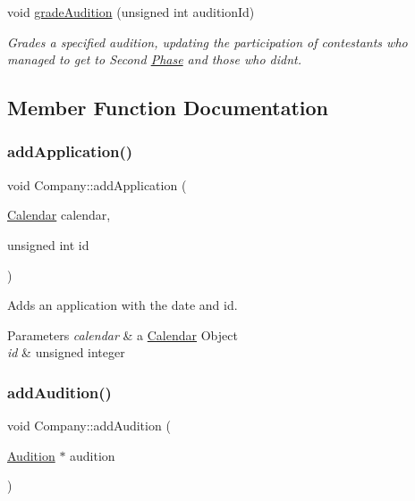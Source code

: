 \begin{DoxyCompactItemize}
$$void \hyperlink{class_company_a56268c11009ad2441a1dde545f7ceacf}{grade\+Audition} (unsigned int audition\+Id)
\begin{DoxyCompactList}\small\item\em Grades a specified audition, updating the participation of contestants who managed to get to Second \hyperlink{class_phase}{Phase} and those who didn\textquotesingle{}t. \end{DoxyCompactList}\end{DoxyCompactItemize}


\subsection{Member Function Documentation}
\mbox{\label{class_company_a3d0fee60dd012d0303483a142dfd4ce1}} 
\subsubsection{\texorpdfstring{add\+Application()}{addApplication()}}
{\footnotesize\ttfamily void Company\+::add\+Application (\begin{DoxyParamCaption}\item[{\hyperlink{class_calendar}{Calendar}}]{calendar,  }\item[{unsigned int}]{id }\end{DoxyParamCaption})}



Adds an application with the date and id. 


\begin{DoxyParams}{Parameters}
{\em calendar} & a \hyperlink{class_calendar}{Calendar} Object \\
\hline
{\em id} & unsigned integer \\
\hline
\end{DoxyParams}
\mbox{\label{class_company_a19096e3cb1b5879774bd17b0c096ffdb}} 
\subsubsection{\texorpdfstring{add\+Audition()}{addAudition()}}
{\footnotesize\ttfamily void Company\+::add\+Audition (\begin{DoxyParamCaption}\item[{\hyperlink{class_audition}{Audition} $\ast$}]{audition }\end{DoxyParamCaption})}



